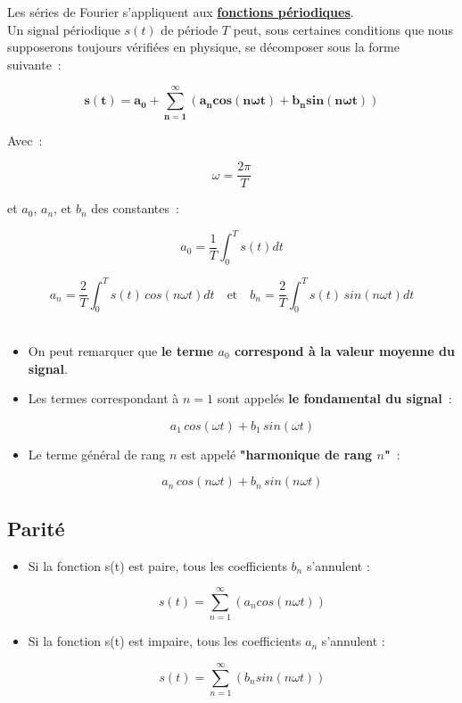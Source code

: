 Les séries de Fourier s'appliquent aux \textbf{\underline{fonctions périodiques}}. \\

Un signal périodique $s(t)$ de période $T$ peut, sous certaines conditions que nous supposerons toujours vérifiées en physique, se décomposer sous la forme suivante~:

\begin{equation}
	\bm{s(t) = a_0 + \sum_{n=1}^{\infty} \left(a_ncos\left( n\omega t\right) + b_nsin\left(n\omega t\right) \right)}
\end{equation}

Avec~: 

$$\omega=\dfrac{2\pi}{T}$$

et $a_0$, $a_n$, et $b_n$ des constantes~:

$$ a_0 = \dfrac{1}{T} \int_{0}^{T} s(t)dt $$

$$ a_n = \dfrac{2}{T} \int_{0}^{T} s(t)\,cos\left( n\omega t \right) dt \quad  \text{et} \quad b_n = \dfrac{2}{T} \int_{0}^{T} s(t)\,sin\left( n\omega t \right) dt $$  \\

\begin{itemize}
\item On peut remarquer que \textbf{le terme $a_0$ correspond à la valeur moyenne du signal}. \\

\item Les termes correspondant à $n=1$ sont appelés \textbf{le fondamental du signal}~:

$$ a_1\,cos\left( \omega t \right) + b_1\,sin\left( \omega t\right) $$  

\item Le terme général de rang $n$ est appelé \textbf{"harmonique de rang $n$"}~:

$$ a_n\,cos\left( n\omega t \right) + b_n\,sin\left( n\omega t\right) $$

\end{itemize}

\subsection*{Parité}

\begin{itemize}
\item Si la fonction s(t) est paire, tous les coefficients $b_n$ s'annulent :

$$ s(t) = \sum_{n=1}^{\infty} \left(a_ncos\left( n\omega t\right) \right) $$

\item Si la fonction s(t) est impaire, tous les coefficients $a_n$ s'annulent :

$$ s(t) = \sum_{n=1}^{\infty} \left(b_nsin\left(n \omega t\right) \right) $$

\end{itemize}

